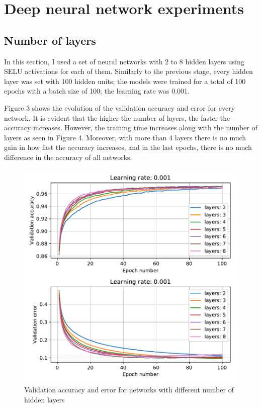 \documentclass{article}
\begin{document}
\section{Deep neural network experiments}
\label{sec:dnnexpts}

\subsection{Number of layers}

In this section, I used a set of neural networks with 2 to 8 hidden layers using SELU activations for each of them. Similarly to the previous stage, every hidden layer was set with 100 hidden units; the models were trained for a total of 100 epochs with a batch size of 100; the learning rate was 0.001. 

Figure 3 shows the evolution of the validation accuracy and error for every network. It is evident that the higher the number of layers, the faster the accuracy increases. However, the training time increases along with the number of layers as seen in Figure 4. Moreover, with more than 4 layers there is no much gain in how fast the accuracy increases, and in the last epochs, there is no much difference in the accuracy of all networks.

\begin{figure}[tb]
\vskip 5mm
\begin{center}
\centerline{\includegraphics[width=\columnwidth]{validation_acc_err_mult_layers}}
\caption{Validation accuracy and error for networks with different number of hidden layers}
\label{fig:sample-graph}
\end{center}
\vskip -5mm
\end{figure} 
\end{document}
